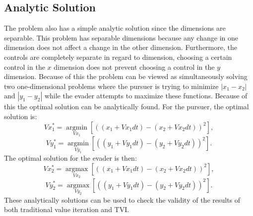 \subsection{Analytic Solution}
The problem also has a simple analytic solution since the dimensions are separable. This problem has separable dimensions because any change in one dimension does not affect a change in the other dimension. Furthermore, the controls are completely separate in regard to dimension, choosing a certain control in the $x$ dimension does not prevent choosing a control in the $y$ dimension. Because of this the problem can be viewed as simultaneously solving two one-dimensional problems where the pursuer is trying to minimize $|x_1-x_2|$ and $|y_1-y_2|$ while the evader attempts to maximize these functions. Because of this the optimal solution can be analytically found. For the pursuer, the optimal solution is:
\begin{equation}\label{puroptx}
Vx_1^*= \underset{Vx_1 }{\operatorname{arg min }}[((x_1 + Vx_1dt)-(x_2+Vx_2dt))^2],
\end{equation}
\begin{equation}\label{puropty}
Vy_1^*= \underset{Vy_1 }{\operatorname{arg min }}[((y_1 + Vy_1dt)-(y_2+Vy_2dt))^2].
\end{equation}
The optimal solution for the evader is then:
\begin{equation}\label{evadoptx}
Vx_2^*= \underset{Vx_2 }{\operatorname{arg max }}[((x_1 + Vx_1dt)-(x_2+Vx_2dt))^2],
\end{equation}
\begin{equation}\label{evadopty}
Vy_2^*= \underset{Vy_2 }{\operatorname{arg max }}[((y_1 + Vy_1dt)-(y_2+Vy_2dt))^2].
\end{equation}
These analytically solutions can be used to check the validity of the results of both traditional value iteration and TVI. 

